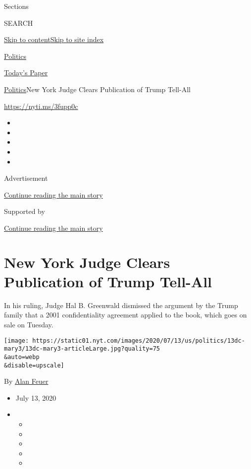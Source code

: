 Sections

SEARCH

\protect\hyperlink{site-content}{Skip to
content}\protect\hyperlink{site-index}{Skip to site index}

\href{https://www.nytimes.com/section/politics}{Politics}

\href{https://myaccount.nytimes.com/auth/login?response_type=cookie\&client_id=vi}{}

\href{https://www.nytimes.com/section/todayspaper}{Today's Paper}

\href{/section/politics}{Politics}\textbar{}New York Judge Clears
Publication of Trump Tell-All

\url{https://nyti.ms/3fupp0c}

\begin{itemize}
\item
\item
\item
\item
\item
\end{itemize}

Advertisement

\protect\hyperlink{after-top}{Continue reading the main story}

Supported by

\protect\hyperlink{after-sponsor}{Continue reading the main story}

\hypertarget{new-york-judge-clears-publication-of-trump-tell-all}{%
\section{New York Judge Clears Publication of Trump
Tell-All}\label{new-york-judge-clears-publication-of-trump-tell-all}}

In his ruling, Judge Hal B. Greenwald dismissed the argument by the
Trump family that a 2001 confidentiality agreement applied to the book,
which goes on sale on Tuesday.

\texttt{[image: https://static01.nyt.com/images/2020/07/13/us/politics/13dc-mary3/13dc-mary3-articleLarge.jpg?quality=75\\\&auto=webp\\\&disable=upscale]}

By \href{https://www.nytimes.com/by/alan-feuer}{Alan Feuer}

\begin{itemize}
\item
  July 13, 2020
\item
  \begin{itemize}
  \item
  \item
  \item
  \item
  \item
  \end{itemize}
\end{itemize}

